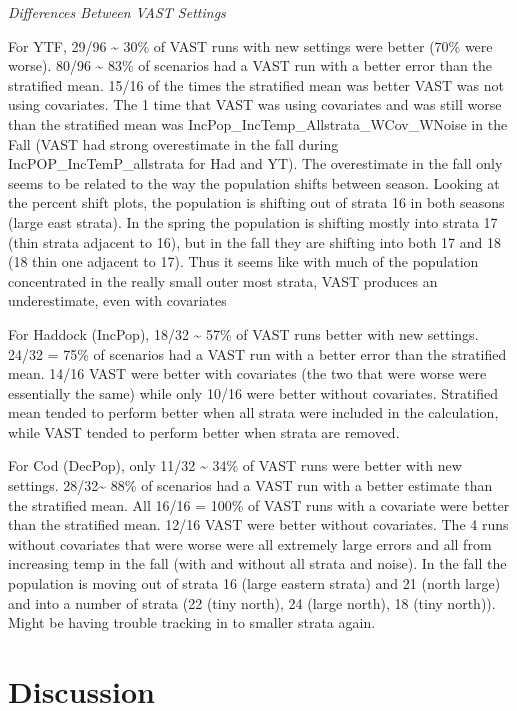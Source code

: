 \documentclass[
  12pt,
]{article}
\begin{document}
\emph{Differences Between VAST Settings}

For YTF, 29/96 \textasciitilde{} 30\% of VAST runs with new settings were better (70\% were worse). 80/96 \textasciitilde{} 83\% of scenarios had a VAST run with a better error than the stratified mean. 15/16 of the times the stratified mean was better VAST was not using covariates. The 1 time that VAST was using covariates and was still worse than the stratified mean was IncPop\_IncTemp\_Allstrata\_WCov\_WNoise in the Fall (VAST had strong overestimate in the fall during IncPOP\_IncTemP\_allstrata for Had and YT). The overestimate in the fall only seems to be related to the way the population shifts between season. Looking at the percent shift plots, the population is shifting out of strata 16 in both seasons (large east strata). In the spring the population is shifting mostly into strata 17 (thin strata adjacent to 16), but in the fall they are shifting into both 17 and 18 (18 thin one adjacent to 17). Thus it seems like with much of the population concentrated in the really small outer most strata, VAST produces an underestimate, even with covariates

For Haddock (IncPop), 18/32 \textasciitilde{} 57\% of VAST runs better with new settings. 24/32 = 75\% of scenarios had a VAST run with a better error than the stratified mean. 14/16 VAST were better with covariates (the two that were worse were essentially the same) while only 10/16 were better without covariates. Stratified mean tended to perform better when all strata were included in the calculation, while VAST tended to perform better when strata are removed.

For Cod (DecPop), only 11/32 \textasciitilde{} 34\% of VAST runs were better with new settings. 28/32\textasciitilde{} 88\% of scenarios had a VAST run with a better estimate than the stratified mean. All 16/16 = 100\% of VAST runs with a covariate were better than the stratified mean. 12/16 VAST were better without covariates. The 4 runs without covariates that were worse were all extremely large errors and all from increasing temp in the fall (with and without all strata and noise). In the fall the population is moving out of strata 16 (large eastern strata) and 21 (north large) and into a number of strata (22 (tiny north), 24 (large north), 18 (tiny north)). Might be having trouble tracking in to smaller strata again.

\section{Discussion}
\end{document}
